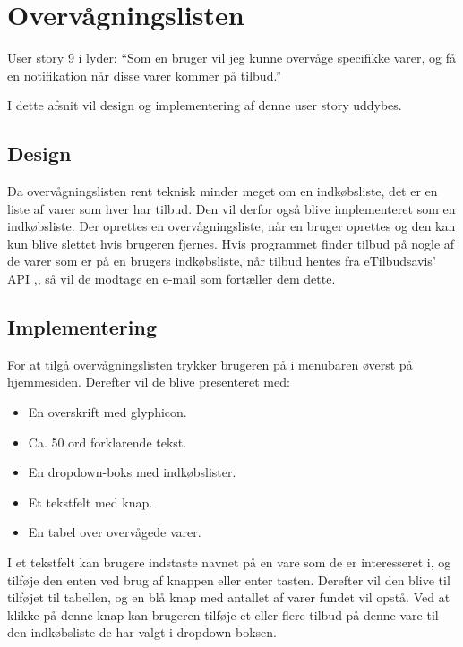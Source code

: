 \section{Overvågningslisten}

User story 9 i  lyder: ``Som en bruger vil jeg kunne overvåge specifikke varer, og få en notifikation når disse varer kommer på tilbud.''

I dette afsnit vil design og implementering af denne user story uddybes.

\subsection{Design}
Da overvågningslisten rent teknisk minder meget om en indkøbsliste, det er en liste af varer som hver har tilbud.
Den vil derfor også blive implementeret som en indkøbsliste. 
Der oprettes en overvågningsliste, når en bruger oprettes og den kan kun blive slettet hvis brugeren fjernes.
Hvis programmet finder tilbud på nogle af de varer som er på en brugers indkøbsliste, når tilbud hentes fra eTilbudsavis' API ,, så vil de modtage en e-mail som fortæller dem dette. 
\subsection{Implementering} 
For at tilgå overvågningslisten trykker brugeren på  i menubaren øverst på hjemmesiden.
Derefter vil de blive presenteret med:
\begin{itemize} 
	\item En overskrift med glyphicon.
	\item Ca. 50 ord forklarende tekst.
	\item En dropdown-boks med indkøbslister.
	\item Et tekstfelt med knap.
	\item En tabel over overvågede varer.
\end{itemize}
I et tekstfelt kan brugere indstaste navnet på en vare som de er interesseret i, og tilføje den enten ved brug af knappen eller enter tasten.
Derefter vil den blive til tilføjet til tabellen, og en blå knap med antallet af varer fundet vil opstå.
Ved at klikke på denne knap kan brugeren tilføje et eller flere tilbud på denne vare til den indkøbsliste de har valgt i dropdown-boksen.

